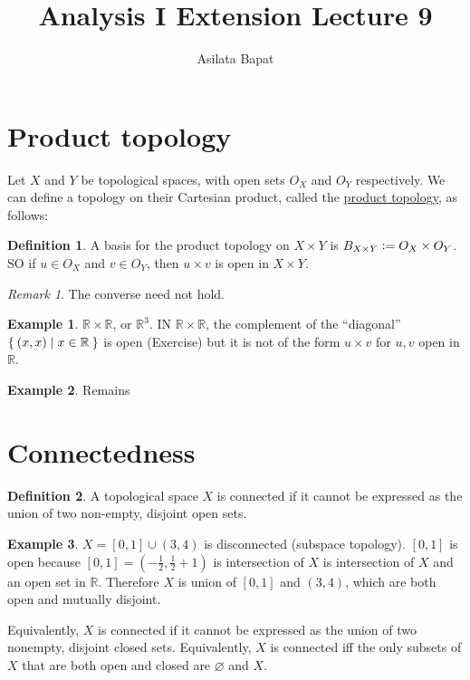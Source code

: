 \documentclass[12pt]{amsart}
\title{Analysis I Extension Lecture 9}
\author{Asilata Bapat}
\newcommand{\bbR}{\mathbb{R}}
\theoremstyle{plain}
\theoremstyle{remark}
\newtheorem*{rmk}{Remark}
\theoremstyle{definition}
\newtheorem*{define}{Definition}
\newtheorem*{eg}{Example}
\begin{document}
\maketitle
{}

\section*{Product topology}
Let $X$ and $Y$ be topological spaces, with open sets $O_X$ and $O_Y$ respectively. We can define a topology on their Cartesian product, called the \ul{product topology}, as follows:
\begin{define}
	A basis for the product topology on $X \times Y$ is $B_{X \times Y} \vcentcolon = O_X \times O_Y$.
	\newline
	SO if $u \in O_X$ and $v \in O_Y$, then $u \times v$ is open in $X \times Y$.
\end{define}

\begin{rmk}
	The converse need not hold.
\end{rmk}

\begin{eg}
	$\bbR \times \bbR$, or $\bbR^3$. IN $\bbR \times \bbR$, the complement of the ``diagonal'' $\Set{(x, x)| x \in \bbR}$ is open (Exercise) but it is not of the form $u \times v$ for $u,v$ open in $\bbR$.
\end{eg}
\begin{eg}
	Remains
\end{eg}

\section*{Connectedness}
\begin{define}
	A topological space $X$ is connected if it cannot be expressed as the union of two non-empty, disjoint open sets.
\end{define}
\begin{eg}
	$X = [0, 1] \cup (3,4)$ is disconnected (subspace topology).
	\newline
	$[0,1]$ is open because $[0, 1] = (-\frac{1}{2}, \frac{1}{2} + 1)$ is intersection of $X$ is intersection of $X$ and an open set in $\bbR$. Therefore $X$ is union of $[0,1]$ and $(3,4)$, which are both open and mutually disjoint.
\end{eg}

Equivalently, $X$ is connected if it cannot be expressed as the union of two nonempty, disjoint closed sets.
\newline
Equivalently, $X$ is connected iff the only subsets of $X$ that are both open and closed are $\varnothing$ and $X$.
\end{document}
